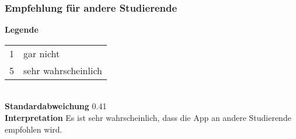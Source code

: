 \begin{frame}\frametitle{Empfehlung für andere Studierende}
    \begin{minipage}{\textwidth}
        \begin{minipage}{.49\textwidth}
        \end{minipage}
        \begin{minipage}{.49\textwidth}
            \textbf{Legende} 
            \begin{tabular}{l l}
                1 & gar nicht \\
                5 & sehr wahrscheinlich
            \end{tabular} \\
            \textbf{Standardabweichung}
            0.41 \\
            \textbf{Interpretation}
            Es ist sehr wahrscheinlich, dass die App an andere Studierende empfohlen wird.
        \end{minipage}
    \end{minipage}
\end{frame}